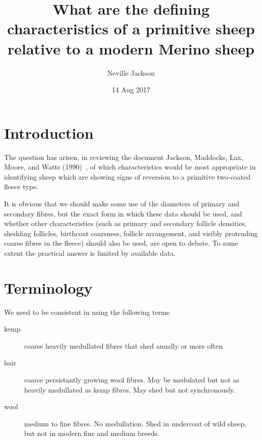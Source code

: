 \documentclass[titlepage]{article}  %
\title{What are the defining characteristics of a primitive sheep relative to a modern Merino sheep}
\author{Neville Jackson}
\date{14 Aug 2017}
\begin{document}
 
 
\maketitle      
\tableofcontents

\clearpage
\section{Introduction} 
The question has arisen, in reviewing the document Jackson, Maddocks, Lax, Moore, and Watts (1990)~\cite{jack:90}, of which characteristics would be most appropriate in identifying sheep which are showing signs of reversion to a primitive two-coated fleece type.

It is obvious that we should make some use of the diameters of primary and secondary fibres, but the exact form in which these data should be used, and whether other characteristics (such as primary and secondary follicle densities, shedding follicles, birthcoat coarsness, follicle arrangement, and visibly protruding coarse fibres in the fleece) should also be used, are open to debate. To some extent the practical answer is limited by available data.

\section{Terminology}
We need to be consistent in using the following terms
\begin{description}
\item[kemp] coarse heavily medullated fibres that shed anually or more often
\item[hair] coarse persistantly growing wool fibres. May be medulated but not as heavily medullated as kemp fibres. May shed but not synchronously.
\item[wool] medium to fine fibres. No medullation. Shed in undercoat of wild sheep, but not in modern fine and medium breeds.
\end{description}
\end{document}
